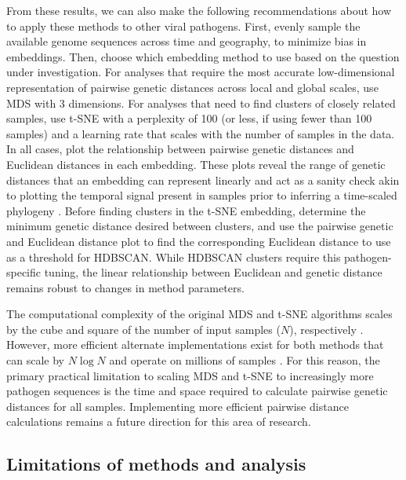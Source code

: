 \documentclass[webpdf,contemporary,large,single]{oup-authoring-template}%
\theoremstyle{thmstyleone}%
\theoremstyle{thmstyletwo}%
\theoremstyle{thmstylethree}%
\begin{document}
From these results, we can also make the following recommendations about how to apply these methods to other viral pathogens.
First, evenly sample the available genome sequences across time and geography, to minimize bias in embeddings.
Then, choose which embedding method to use based on the question under investigation.
For analyses that require the most accurate low-dimensional representation of pairwise genetic distances across local and global scales, use MDS with 3 dimensions.
For analyses that need to find clusters of closely related samples, use t-SNE with a perplexity of 100 (or less, if using fewer than 100 samples) and a learning rate that scales with the number of samples in the data.
In all cases, plot the relationship between pairwise genetic distances and Euclidean distances in each embedding.
These plots reveal the range of genetic distances that an embedding can represent linearly and act as a sanity check akin to plotting the temporal signal present in samples prior to inferring a time-scaled phylogeny \citep{Rambaut2016,Sagulenko2018}.
Before finding clusters in the t-SNE embedding, determine the minimum genetic distance desired between clusters, and use the pairwise genetic and Euclidean distance plot to find the corresponding Euclidean distance to use as a threshold for HDBSCAN.
While HDBSCAN clusters require this pathogen-specific tuning, the linear relationship between Euclidean and genetic distance remains robust to changes in method parameters.

The computational complexity of the original MDS and t-SNE algorithms scales by the cube and square of the number of input samples ($N$), respectively \citep{Yang2006,maaten2008visualizing}.
However, more efficient alternate implementations exist for both methods that can scale by $N\log{N}$ and operate on millions of samples \citep{Yang2006,Delicado2024,Yang2013,vandermaaten2013,vandermaaten2014}.
For this reason, the primary practical limitation to scaling MDS and t-SNE to increasingly more pathogen sequences is the time and space required to calculate pairwise genetic distances for all samples.
Implementing more efficient pairwise distance calculations remains a future direction for this area of research.

\subsection{Limitations of methods and analysis}
\end{document}
